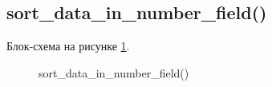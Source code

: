 \subsection{sort\_data\_in\_number\_field()}

Блок-схема на рисунке \ref{fig:sort_data_in_number_field}.

\begin{figure}[p]
    \caption{sort\_data\_in\_number\_field()}
    \label{fig:sort_data_in_number_field}
\end{figure}





\newpage